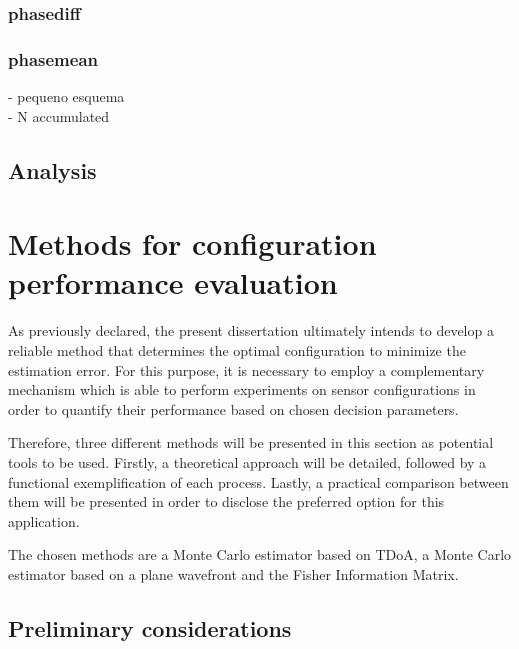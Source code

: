 \subsubsection{phasediff}

\subsubsection{phasemean}
- pequeno esquema \\
- N accumulated \\

\subsection{Analysis}


\section{Methods for configuration performance evaluation} \label{subsec:AoA}

As previously declared, the present dissertation ultimately intends to develop a reliable method that determines the optimal configuration to minimize the estimation error. For this purpose, it is necessary to employ a complementary mechanism which is able to perform experiments on sensor configurations in order to quantify their performance based on chosen decision parameters.

Therefore, three different methods will be presented in this section as potential tools to be used. Firstly, a theoretical approach will be detailed, followed by a functional exemplification of each process. Lastly, a practical comparison between them will be presented in order to disclose the preferred option for this application.

The chosen methods are a Monte Carlo estimator based on TDoA, a Monte Carlo estimator based on a plane wavefront and the Fisher Information Matrix.

\subsection{Preliminary considerations}

